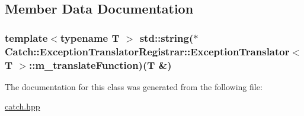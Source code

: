 \subsection{Member Data Documentation}
\hypertarget{class_catch_1_1_exception_translator_registrar_1_1_exception_translator_aa3d9238a0f9b3122a27ac1e60cb79ef9}{
\subsubsection[{m\-\_\-translate\-Function}]{\setlength{\rightskip}{0pt plus 5cm}template$<$typename T $>$ std\-::string($\ast$ {\bf Catch\-::\-Exception\-Translator\-Registrar\-::\-Exception\-Translator}$<$ T $>$\-::m\-\_\-translate\-Function)(T \&)\hspace{0.3cm}{\ttfamily [protected]}}}\label{class_catch_1_1_exception_translator_registrar_1_1_exception_translator_aa3d9238a0f9b3122a27ac1e60cb79ef9}


The documentation for this class was generated from the following file\-:\begin{DoxyCompactItemize}
\item 
\hyperlink{catch_8hpp}{catch.\-hpp}\end{DoxyCompactItemize}
